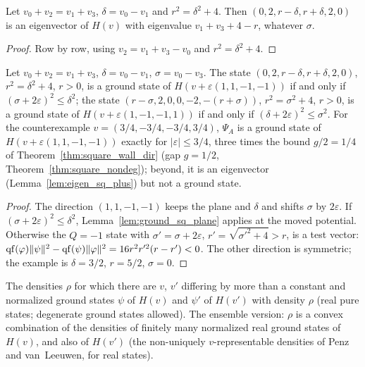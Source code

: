 \begin{lemma}[The $Q=+1$ state is always an eigenvector on the plane]
  \label{lem:eigen_sq_plus}
  \leanok
  Let $v_0+v_2=v_1+v_3$, $\delta=v_0-v_1$ and $r^2=\delta^2+4$. Then $(0,2,r-\delta,r+\delta,2,0)$ is an eigenvector
  of $H(v)$ with eigenvalue $v_1+v_3+4-r$, whatever $\sigma$.
\end{lemma}
\begin{proof}
  \leanok
  Row by row, using $v_2=v_1+v_3-v_0$ and $r^2=\delta^2+4$.
\end{proof}

\begin{theorem}
  \label{thm:square_segment}
  \leanok
  Let $v_0+v_2=v_1+v_3$, $\delta=v_0-v_1$, $\sigma=v_0-v_3$. The state $(0,2,r-\delta,r+\delta,2,0)$, $r^2=\delta^2+4$,
  $r>0$, is a ground state of $H(v+\varepsilon(1,1,-1,-1))$ if and only if $(\sigma+2\varepsilon)^2\le\delta^2$; the
  state $(r-\sigma,2,0,0,-2,-(r+\sigma))$, $r^2=\sigma^2+4$, $r>0$, is a ground state of $H(v+\varepsilon(1,-1,-1,1))$
  if and only if $(\delta+2\varepsilon)^2\le\sigma^2$. For the counterexample $v=(3/4,-3/4,-3/4,3/4)$, $\Psi_A$ is a
  ground state of $H(v+\varepsilon(1,1,-1,-1))$ exactly for $|\varepsilon|\le3/4$, three times the bound $g/2=1/4$ of
  Theorem~\ref{thm:square_wall_dir} (gap $g=1/2$, Theorem~\ref{thm:square_nondeg}); beyond, it is an eigenvector
  (Lemma~\ref{lem:eigen_sq_plus}) but not a ground state.
\end{theorem}
\begin{proof}
  \leanok
  The direction $(1,1,-1,-1)$ keeps the plane and $\delta$ and shifts $\sigma$ by $2\varepsilon$. If
  $(\sigma+2\varepsilon)^2\le\delta^2$, Lemma~\ref{lem:ground_sq_plane} applies at the moved potential. Otherwise the
  $Q=-1$ state with $\sigma'=\sigma+2\varepsilon$, $r'=\sqrt{\sigma'^2+4}>r$, is a test vector:
  $\operatorname{qf}(\varphi)\|\psi\|^2-\operatorname{qf}(\psi)\|\varphi\|^2=16r^2r'^2(r-r')<0$. The other direction is symmetric; the example is
  $\delta=3/2$, $r=5/2$, $\sigma=0$.
\end{proof}

\begin{definition}
  \label{def:SharedDens}
  \leanok
  The densities $\rho$ for which there are $v$, $v'$ differing by more than a constant and normalized ground states
  $\psi$ of $H(v)$ and $\psi'$ of $H(v')$ with density $\rho$ (real pure states; degenerate ground states allowed).
  The ensemble version: $\rho$ is a convex combination of the densities of finitely many normalized real ground
  states of $H(v)$, and also of $H(v')$ (the non-uniquely $v$-representable densities of Penz and van~Leeuwen, for
  real states).
\end{definition}

